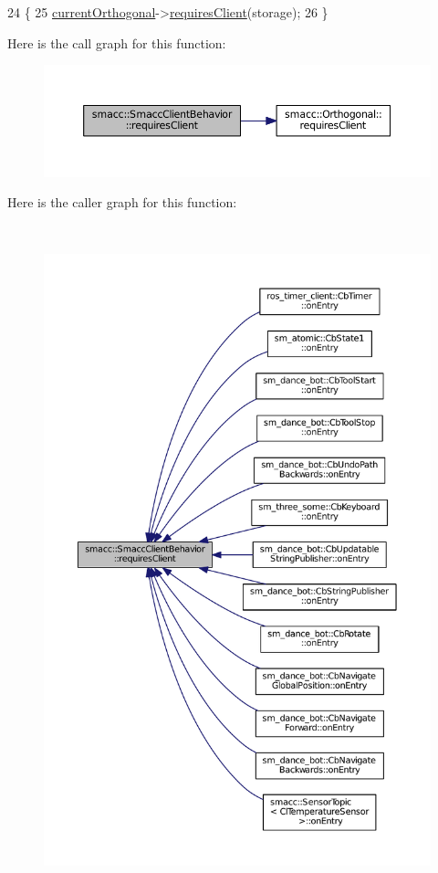 \begin{DoxyCode}
24 \{
25     \hyperlink{classsmacc_1_1SmaccClientBehavior_a642742da14ffa20e323a03eefecfc8b2}{currentOrthogonal}->\hyperlink{classsmacc_1_1Orthogonal_abcde9f489cdf94acca381ea67649a723}{requiresClient}(storage);
26 \}
\end{DoxyCode}


Here is the call graph for this function\+:
\nopagebreak
\begin{figure}[H]
\begin{center}
\leavevmode
\includegraphics[width=350pt]{classsmacc_1_1SmaccClientBehavior_a917f001e763a1059af337bf4e164f542_cgraph}
\end{center}
\end{figure}




Here is the caller graph for this function\+:
\nopagebreak
\begin{figure}[H]
\begin{center}
\leavevmode
\includegraphics[height=550pt]{classsmacc_1_1SmaccClientBehavior_a917f001e763a1059af337bf4e164f542_icgraph}
\end{center}
\end{figure}


